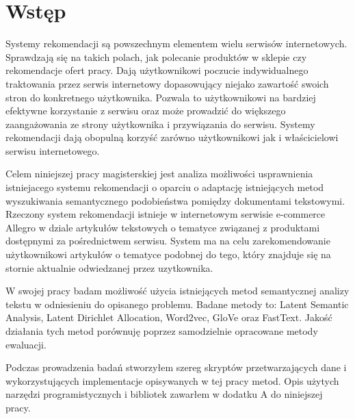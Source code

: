\documentclass[pl]{minipw} %
\begin{document}
\makestatement


\cleardoublepage
\tableofcontents


\cleardoublepage
\pagestyle{fancy}

\chapter*{Wstęp}
Systemy rekomendacji są powszechnym elementem wielu serwisów internetowych. Sprawdzają się na takich polach, jak polecanie produktów w sklepie czy rekomendacje ofert pracy. Dają użytkownikowi poczucie indywidualnego traktowania przez serwis internetowy dopasowujący niejako zawartość swoich stron do konkretnego użytkownika. Pozwala to użytkownikowi na bardziej efektywne korzystanie z serwisu oraz może prowadzić do większego zaangażowania ze strony użytkownika i przywiązania do serwisu. Systemy rekomendacji dają obopulną korzyść zarówno użytkownikowi jak i właścicielowi serwisu internetowego.

Celem niniejszej pracy magisterskiej jest analiza możliwości usprawnienia istniejacego systemu rekomendacji o oparciu o adaptację istniejących metod wyszukiwania semantycznego podobieństwa pomiędzy dokumentami tekstowymi. Rzeczony system rekomendacji istnieje w internetowym serwisie e-commerce Allegro w dziale artykułów tekstowych o tematyce związanej z produktami dostępnymi za pośrednictwem serwisu. System ma na celu zarekomendowanie użytkownikowi artykułów o tematyce podobnej do tego, który znajduje się na stornie aktualnie odwiedzanej przez uzytkownika.

W swojej pracy badam możliwość użycia istniejących metod semantycznej analizy tekstu w odniesieniu do opisanego problemu. Badane metody to: Latent Semantic Analysis, Latent Dirichlet Allocation, Word2vec, GloVe oraz FastText. Jakość działania tych metod porównuję poprzez samodzielnie opracowane metody ewaluacji.

Podczas prowadzenia badań stworzyłem szereg skryptów przetwarzających dane i wykorzystujących implementacje opisywanych w tej pracy metod. Opis użytych narzędzi programistycznych i bibliotek zawarłem w dodatku A do niniejszej pracy.
\end{document}
